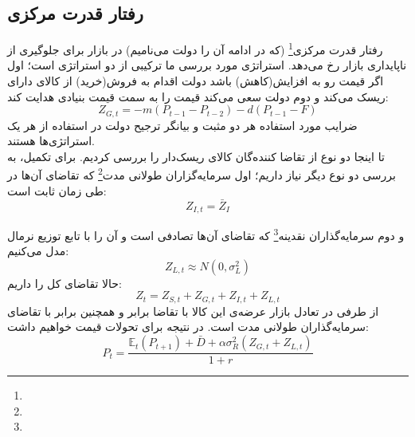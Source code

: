 \documentclass[13pt,onecolumn,a4paper]{article}
\begin{document}
	\subsection{رفتار قدرت مرکزی}
	رفتار قدرت مرکزی\footnote{} (که در ادامه آن را دولت می‌نامیم) در بازار برای جلوگیری از ناپایداری بازار رخ می‌دهد. استراتژی مورد بررسی ما ترکیبی از دو استراتژی است؛ اول اگر قیمت رو به افزایش(کاهش) باشد دولت اقدام به فروش(خرید) از کالای دارای ریسک می‌کند و دوم دولت سعی می‌کند قیمت را به سمت قیمت بنیادی هدایت کند:
	$$Z_{G,t}=-m\left(P_{t-1}-P_{t-2}\right)-d\left(P_{t-1}-F\right)$$
	ضرایب مورد استفاده هر دو مثبت و بیانگر ترجیح دولت در استفاده از هر یک استراتژی‌ها هستند.\\
	تا اینجا دو نوع از تقاضا کننده‌گان کالای ریسک‌دار را بررسی کردیم. برای تکمیل، به بررسی دو نوع دیگر نیاز داریم؛ اول سرمایه‌گزاران طولانی مدت\footnote{} که تقاضای آن‌ها در طی زمان ثابت است:
	$$Z_{I,t}=\bar{Z}_{I}$$
	
	 و دوم سرمایه‌گذاران نقدینه\footnote{} که تقاضای آن‌ها تصادفی است و آن را با تابع توزیع نرمال مدل می‌کنیم:
	$$Z_{L,t}\approx N(0,\sigma_L^2)$$
	 حالا تقاضای کل را داریم:
	 $$Z_{t}=Z_{S,t}+Z_{G,t}+Z_{I,t}+Z_{L,t}$$
	از طرفی در تعادل بازار عرضه‌ی این کالا با تقاضا برابر و همچنین برابر با تقاضای سرمایه‌گذاران طولانی مدت است. در نتیجه برای تحولات قیمت خواهیم داشت:
	$$P_t=\frac{\mathbb{E}_{t}\left(P_{t+1}\right)+\bar{D}+\alpha\sigma_R^2(Z_{G,t}+Z_{L,t})}{1+r}$$
	\pagebreak
\end{document}
